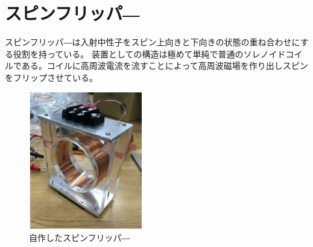 \section{スピンフリッパ―}
スピンフリッパ―は入射中性子をスピン上向きと下向きの状態の重ね合わせにする役割を持っている。
装置としての構造は極めて単純で普通のソレノイドコイルである。コイルに高周波電流を流すことによって高周波磁場を作り出しスピンをフリップさせている。
\begin{figure}[H]
\centering
\includegraphics[width=5cm,height=6cm]{device/spinflipperphoto.pdf}\caption{自作したスピンフリッパ―}
\end{figure}
